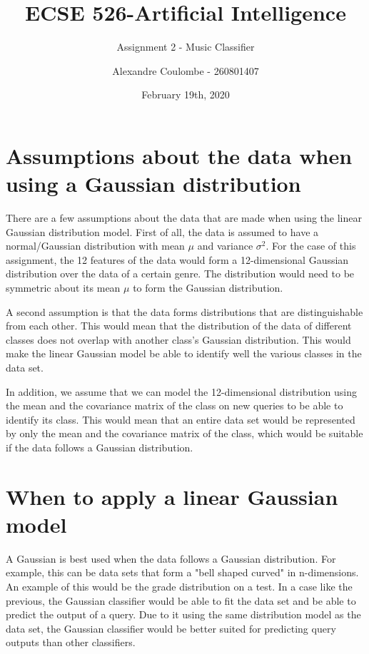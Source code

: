 \documentclass[11pt]{scrartcl}
\begin{document}
\title{ECSE 526-Artificial Intelligence}
\subtitle{Assignment 2 - Music Classifier}
\author{Alexandre Coulombe - 260801407}
\date{February 19th, 2020}
\maketitle



\section{Assumptions about the data when using a Gaussian distribution}

There are a few assumptions about the data that are made when using the linear Gaussian distribution model. First of all, the data is assumed to have a normal/Gaussian distribution with mean $\mu$ and variance $\sigma^2$. For the case of this assignment, the 12 features of the data would form a 12-dimensional Gaussian distribution over the data of a certain genre. The distribution would need to be symmetric about its mean $\mu$ to form the Gaussian distribution. 

A second assumption is that the data forms distributions that are distinguishable from each other. This would mean that the distribution of the data of different classes does not overlap with another class's Gaussian distribution. This would make the linear Gaussian model be able to identify well the various classes in the data set.

In addition, we assume that we can model the 12-dimensional distribution using the mean and the covariance matrix of the class on new queries to be able to identify its class. This would mean that an entire data set would be represented by only the mean and the covariance matrix of the class, which would be suitable if the data follows a Gaussian distribution. 

\section{When to apply a linear Gaussian model}

A Gaussian is best used when the data follows a Gaussian distribution. For example, this can be data sets that form a "bell shaped curved" in n-dimensions. An example of this would be the grade distribution on a test. In a case like the previous, the Gaussian classifier would be able to fit the data set and be able to predict the output of a query. Due to it using the same distribution model as the data set, the Gaussian classifier would be better suited for predicting query outputs than other classifiers.
\end{document}
